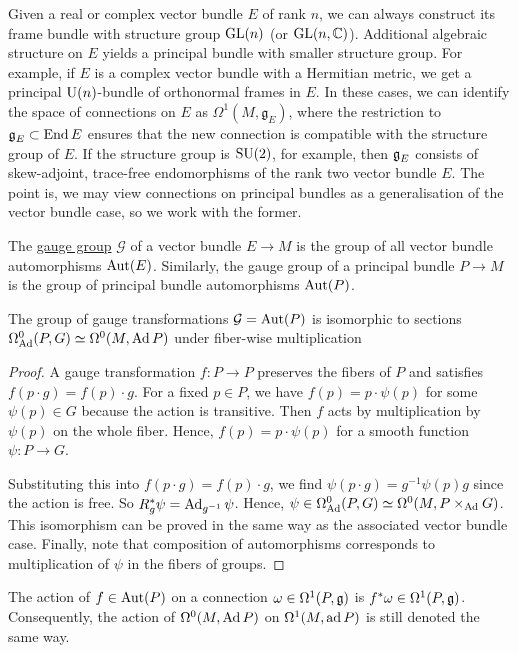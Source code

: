 Given a real or complex vector bundle $E$ of rank $n$, we can always construct 
its frame bundle with structure group $\operatorname{GL}(n)$ (or $\operatorname{GL}(n,\mathbb{C})$).
Additional algebraic structure on $E$ yields a principal bundle with smaller
structure group. For example,
if $E$ is a complex vector bundle with a Hermitian metric, we get a principal
$\operatorname{U}(n)$-bundle of orthonormal frames in  $E$. In these cases, we can identify
the space of connections on $E$ as $\Omega^1(M,\mathfrak{g}_E)$, where
the restriction to $\operatorname{\mathfrak{g}}_E \subset \operatorname{End} E$ ensures that the new connection is
compatible with the structure group of  $E$.
If the structure group is $\operatorname{SU}(2)$, for example, then
$\operatorname{\mathfrak{g}}_E$ consists of skew-adjoint, trace-free endomorphisms of the rank two vector
bundle $E$. The point is, we may view connections on principal bundles as a
generalisation of the vector bundle case, so we work with the former.

\begin{defn}
	The \underline{gauge group} $\mathcal{G}$ of a vector bundle $E\to M$ is the group of all
	vector bundle automorphisms $\operatorname{Aut}(E)$. Similarly, the gauge group of a
	principal bundle $P\to M$ is the group of principal bundle automorphisms
	$\operatorname{Aut}(P)$.
\end{defn}

\begin{prop} \label{prop:gauge_trans_space} %
	The group of gauge transformations $\mathcal{G}=\operatorname{Aut}(P)$ is isomorphic to 
	sections $\Omega_{\operatorname{Ad}}^0(P,G)\simeq \Omega^0(M,\operatorname{Ad} P)$ under fiber-wise 
	multiplication 
\end{prop}
\begin{proof}
	A gauge transformation $f : P \to P$ preserves the fibers of  $P$ and
	satisfies  $f(p\cdot g) = f(p) \cdot g$. For a fixed $p\in P$, we have 
	$f(p) = p\cdot \psi(p)$ for some $\psi(p)\in G$ because the action is
	transitive. Then $f$ acts by multiplication 
	by $\psi(p)$ on the whole fiber. Hence, $f(p) =
	p\cdot \psi(p)$ for a smooth function  $\psi : P \to G$. 

	Substituting this into $f(p\cdot g) = f(p)\cdot g$, we find  $\psi(p\cdot g)
	= g^{-1}\psi(p) g$ since the action is free. So $R_g^*\psi =
	\operatorname{Ad}_{g^{-1}}\psi$. Hence, $\psi \in \Omega^0_{\operatorname{Ad}}(P,G) \simeq
	\Omega^0(M,P\times_{\operatorname{Ad}}G)$. This isomorphism can be proved in the same way
	as the associated vector bundle case.
	Finally, note that composition of automorphisms corresponds to
	multiplication of $\psi$ in the fibers of groups. 
\end{proof}
The action of $f \in \operatorname{Aut}(P)$ on a connection  $\omega\in \Omega^1(P,\operatorname{\mathfrak{g}})$ is
$f^*\omega \in \Omega^1(P,\operatorname{\mathfrak{g}})$. Consequently, the action of $\Omega^0(M,\operatorname{Ad}
P)$ on  $\Omega^1(M,\operatorname{ad} P)$ is still denoted the same way.

